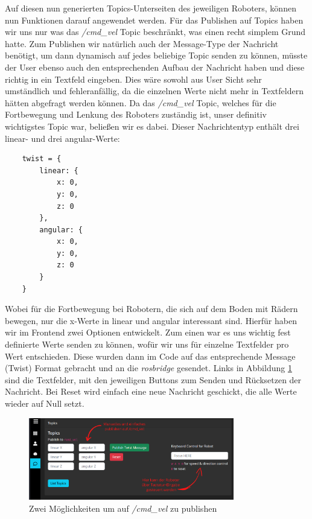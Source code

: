 \begin{flushleft}
Auf diesen nun generierten Topics-Unterseiten des jeweiligen Roboters, können nun Funktionen darauf angewendet werden.
Für das Publishen auf Topics haben wir uns nur was das \textit{/cmd\_vel} Topic beschränkt, was einen recht simplem Grund hatte.
Zum Publishen wir natürlich auch der Message-Type der Nachricht benötigt, um dann dynamisch auf jedes beliebige Topic senden zu können, müsste der User ebenso auch den entsprechenden Aufbau der Nachricht haben und diese richtig in ein Textfeld eingeben.
Dies wäre sowohl aus User Sicht sehr umständlich und fehleranfällig, da die einzelnen Werte nicht mehr in Textfeldern hätten abgefragt werden können. 
Da das \textit{/cmd\_vel} Topic, welches für die Fortbewegung und Lenkung des Roboters zuständig ist, unser definitiv wichtigstes Topic war, beließen wir es dabei.
Dieser Nachrichtentyp enthält drei linear- und drei angular-Werte:
\begin{lstlisting}
    twist = {
        linear: {
            x: 0,
            y: 0,
            z: 0
        },
        angular: {
            x: 0,
            y: 0,
            z: 0
        }
    }
\end{lstlisting}
Wobei für die Fortbewegung bei Robotern, die sich auf dem Boden mit Rädern bewegen, nur die x-Werte in linear und angular interessant sind.
Hierfür haben wir im Frontend zwei Optionen entwickelt. 
Zum einen war es uns wichtig fest definierte Werte senden zu können, wofür wir uns für einzelne Textfelder pro Wert entschieden.
Diese wurden dann im Code auf das entsprechende Message (Twist) Format gebracht und an die \textit{rosbridge} gesendet.
Links in Abbildung \ref{fig:web_publish} sind die Textfelder, mit den jeweiligen Buttons zum Senden und Rücksetzen der Nachricht.
Bei Reset wird einfach eine neue Nachricht geschickt, die alle Werte wieder auf Null setzt.

\begin{figure}[h!]
    \centering
    \includegraphics[width=0.8\textwidth]{imgs/web/web_publish.png}
    \caption{Zwei Möglichkeiten um auf \textit{/cmd\_vel} zu publishen}
    \label{fig:web_publish}%
\end{figure}


\end{flushleft}
